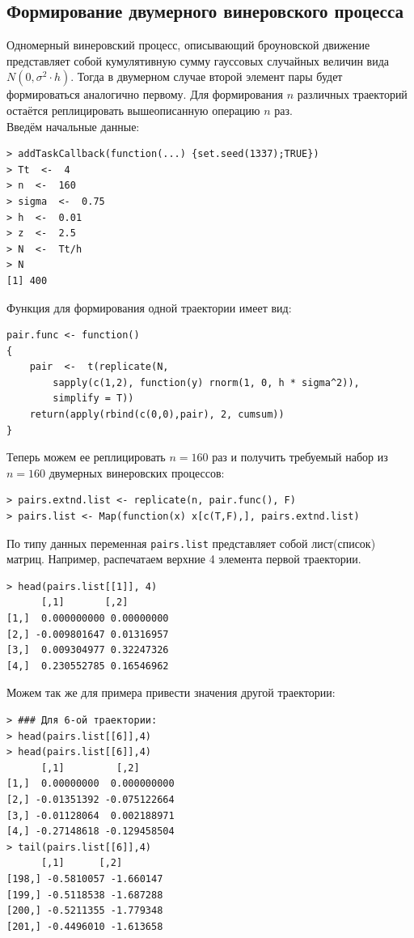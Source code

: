 \documentclass[14pt,a4paper]{scrartcl}
\begin{document}
\subsection{Формирование двумерного винеровского процесса}
Одномерный винеровский процесс, описывающий броуновской движение представляет собой кумулятивную сумму гауссовых случайных величин вида ${N(0,\sigma^2 \cdot h)}$. Тогда в двумерном случае второй элемент пары будет формироваться аналогично первому. Для формирования $n$ различных траекторий остаётся реплицировать  вышеописанную операцию $n$ раз. \\
Введём начальные данные:
\begin{verbatim}
> addTaskCallback(function(...) {set.seed(1337);TRUE})
> Tt  <-  4
> n  <-  160
> sigma  <-  0.75
> h  <-  0.01
> z  <-  2.5
> N  <-  Tt/h
> N
[1] 400
\end{verbatim}


Функция для формирования одной траектории имеет вид:
\begin{verbatim}
pair.func <- function() 
{
	pair  <-  t(replicate(N,
		sapply(c(1,2), function(y) rnorm(1, 0, h * sigma^2)),
		simplify = T))
	return(apply(rbind(c(0,0),pair), 2, cumsum))
}
\end{verbatim}



Теперь можем ее реплицировать $n = 160$ раз и получить требуемый набор из $n = 160$ двумерных винеровских процессов:

\begin{verbatim}
> pairs.extnd.list <- replicate(n, pair.func(), F)
> pairs.list <- Map(function(x) x[c(T,F),], pairs.extnd.list)
\end{verbatim}

\pagebreak

По типу данных переменная \texttt{pairs.list} представляет собой лист(список) матриц. Например, распечатаем верхние 4 элемента первой траектории. 

\begin{verbatim}
> head(pairs.list[[1]], 4)
	  [,1]       [,2]
[1,]  0.000000000 0.00000000
[2,] -0.009801647 0.01316957
[3,]  0.009304977 0.32247326
[4,]  0.230552785 0.16546962
\end{verbatim}

Можем так же для примера привести значения другой траектории:
\begin{verbatim}
> ### Для 6-ой траектории:
> head(pairs.list[[6]],4)
> head(pairs.list[[6]],4)
	  [,1]         [,2]
[1,]  0.00000000  0.000000000
[2,] -0.01351392 -0.075122664
[3,] -0.01128064  0.002188971
[4,] -0.27148618 -0.129458504
> tail(pairs.list[[6]],4)
	  [,1]      [,2]
[198,] -0.5810057 -1.660147
[199,] -0.5118538 -1.687288
[200,] -0.5211355 -1.779348
[201,] -0.4496010 -1.613658
\end{verbatim}
\end{document}
